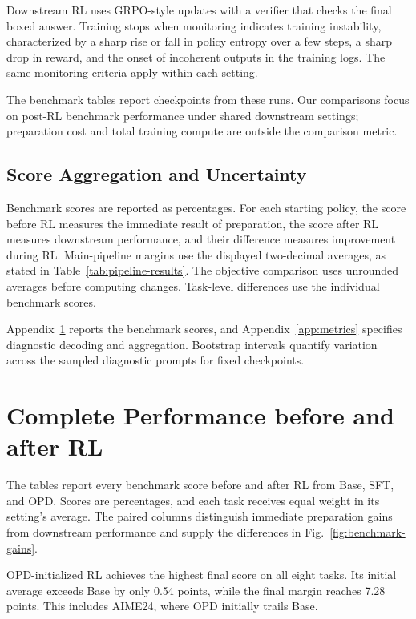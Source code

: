 \documentclass[]{jingdong}
\theoremstyle{plain}
\theoremstyle{definition}
\theoremstyle{remark}
\begin{document}
Downstream RL uses GRPO-style updates with a verifier that checks the final boxed answer. Training stops when monitoring indicates training instability, characterized by a sharp rise or fall in policy entropy over a few steps, a sharp drop in reward, and the onset of incoherent outputs in the training logs. The same monitoring criteria apply within each setting.

The benchmark tables report checkpoints from these runs. Our comparisons focus on post-RL benchmark performance under shared downstream settings; preparation cost and total training compute are outside the comparison metric.

\subsection{Score Aggregation and Uncertainty}

Benchmark scores are reported as percentages. For each starting policy, the score before RL measures the immediate result of preparation, the score after RL measures downstream performance, and their difference measures improvement during RL. Main-pipeline margins use the displayed two-decimal averages, as stated in Table~\ref{tab:pipeline-results}. The objective comparison uses unrounded averages before computing changes. Task-level differences use the individual benchmark scores.

Appendix~\ref{app:full_results} reports the benchmark scores, and Appendix~\ref{app:metrics} specifies diagnostic decoding and aggregation. Bootstrap intervals quantify variation across the sampled diagnostic prompts for fixed checkpoints.

\clearpage
\section{Complete Performance before and after RL}
\label{app:full_results}

The tables report every benchmark score before and after RL from Base, SFT, and OPD. Scores are percentages, and each task receives equal weight in its setting's average. The paired columns distinguish immediate preparation gains from downstream performance and supply the differences in Fig.~\ref{fig:benchmark-gains}.

OPD-initialized RL achieves the highest final score on all eight tasks. Its initial average exceeds Base by only 0.54 points, while the final margin reaches 7.28 points. This includes AIME24, where OPD initially trails Base.
\end{document}
